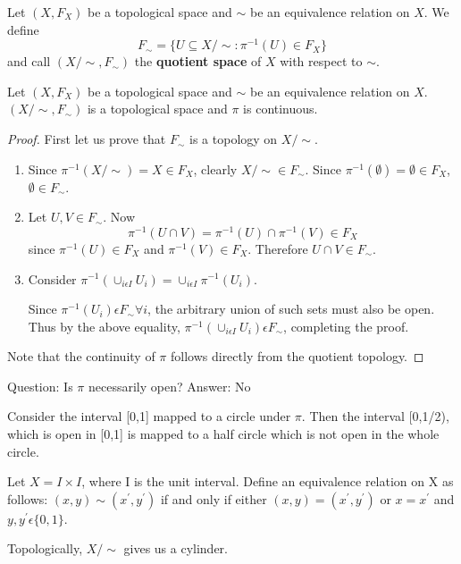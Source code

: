 \begin{definition}
Let $(X, F_X)$ be a topological space and $\sim$ be an equivalence relation on $X$. We define 
\[F_{\sim} = \{U \subseteq X / \sim : \pi^{-1}(U) \in F_X\}\]
and call $(X / \sim, F_{\sim})$ the {\bf quotient space} of $X$ with respect to $\sim$. 
\end{definition}

\begin{smallfact}
Let $(X, F_X)$ be a topological space and $\sim$ be an equivalence relation on $X$. $(X / \sim, F_{\sim})$ is a topological space and $\pi$ is continuous. 
\end{smallfact}
\begin{proof}
First let us prove that $F_{\sim}$ is a topology on $X / \sim$. 
\begin{enumerate}
	\item Since $\pi^{-1}(X / \sim) = X \in F_X$, clearly $X / \sim \in F_{\sim}$. Since $\pi^{-1}(\emptyset) = \emptyset \in F_X$, $\emptyset \in F_{\sim}$. 
	\item Let $U, V \in F_{\sim}$. Now $$\pi^{-1}(U \cap V) = \pi^{-1}(U) \cap \pi^{-1}(V) \in F_X$$ since $ \pi^{-1}(U) \in F_X$ and $\pi^{-1}(V) \in F_X$. Therefore $U \cap V \in F_{\sim}$. 
	\item Consider $\pi^{-1}(\cup_{i \epsilon I}U_{i}) = \cup_{i \epsilon I} \pi^{-1}(U_{i})$.

Since $\pi^{-1}(U_{i}) \epsilon F_{\sim} \forall i$, the arbitrary union of such sets must also be open.  Thus by the above equality, $\pi^{-1}(\cup_{i \epsilon I}U_{i}) \epsilon F_{\sim}$, completing the proof. 
\end{enumerate}
Note that the continuity of $\pi$ follows directly from the quotient topology.
\end{proof}

Question: Is $\pi$ necessarily open?
Answer: No

Consider the interval [0,1] mapped to a circle under $\pi$.  Then the interval [0,1/2), which is open in [0,1] is mapped to a half circle which is not open in the whole circle. 
\placeholder

\begin{example}
Let $X=I \times I$, where I is the unit interval.  Define an equivalence relation on X as follows: 
$(x,y)\sim(x^{'},y^{'})$ if and only if either $(x,y)=(x^{'},y^{'})$ or $x=x^{'}$ and $y,y^{'} \epsilon \{0,1\}$.

Topologically, $X/\sim$ gives us a cylinder.
\placeholder
\end{example}


